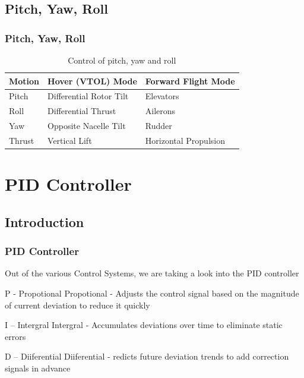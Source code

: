 \documentclass{beamer}
\begin{document}
\subsection{Pitch, Yaw, Roll}
\begin{frame}
\frametitle{Pitch, Yaw, Roll}
\begin{table}
\centering
\begin{tabular}{p{2cm} p{4cm} p{3cm}}
\toprule
\textbf{Motion} & \textbf{Hover (VTOL) Mode} & \textbf{Forward Flight Mode}\\
\midrule
Pitch  & Differential Rotor Tilt  & Elevators  \\
Roll   & Differential Thrust  & Ailerons \\
Yaw    & Opposite Nacelle Tilt  & Rudder  \\
Thrust & Vertical Lift  & Horizontal Propulsion \\
\bottomrule
\end{tabular}
\caption{Control of pitch, yaw and roll}
\end{table}
\end{frame} 

\section{PID Controller}

\subsection{Introduction}
\begin{frame}
\frametitle{PID Controller}
Out of the various Control Systems, we are taking a look into the PID controller

\begin{block}{P - Propotional}
Propotional - Adjusts the control signal based on the magnitude of current deviation to reduce it quickly

\end{block}

\begin{block}{I – Intergral}
Intergral - Accumulates deviations over time to eliminate static errors

\end{block}

\begin{block}{D – Diiferential}
Diiferential - redicts future deviation trends to add correction signals in advance

\end{block}
\end{frame}
\end{document}
